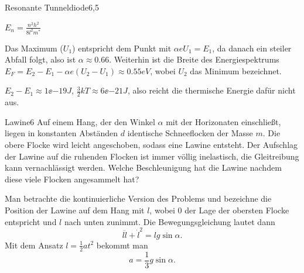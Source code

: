 \begin{problem}{Resonante Tunneldiode}{6,5}
\begin{solution}
\begin{abcenum}
\item $E_n = \frac{n^2 h^2}{8 l^2 m^*}$
\item Das Maximum ($U_1$) entspricht dem Punkt mit $\alpha e U_1 = E_1$, da danach ein steiler Abfall folgt, also ist $\alpha \approx 0.66$. Weiterhin ist die Breite des Energiespektrums $E_F = E_2 - E_1 - \alpha e (U_2 - U_1) \approx 0.55 \unit{eV}$, wobei $U_2$ das Minimum bezeichnet.
\item $E_2 - E_1 \approx 1\ee{-19}\unit{J}$, $\frac32 kT \approx 6\ee{-21}\unit{J}$, also reicht die thermische Energie dafür nicht aus.
\end{abcenum}
\end{solution}
\end{problem}


\begin{problem}{Lawine}{6}
Auf einem Hang, der den Winkel $\alpha$ mit der Horizonaten einschließt, liegen in konstanten Abständen $d$ identische Schneeflocken der Masse $m$. Die obere Flocke wird leicht angeschoben, sodass eine Lawine entsteht. Der Aufschlag der Lawine auf die ruhenden Flocken ist immer völlig inelastisch, die Gleitreibung kann vernachlässigt werden. Welche Beschleunigung hat die Lawine nachdem diese viele Flocken angesammelt hat?
\begin{solution}
Man betrachte die kontinuierliche Version des Problems und bezeichne die Position der Lawine auf dem Hang mit $l$, wobei $0$ der Lage der obersten Flocke entspricht und $l$ nach unten zunimmt. Die Bewegungsgleichung lautet dann
\[
l \ddot l + \dot l^2 = l g \sin\alpha.
\]
Mit dem Ansatz $l = \frac12 a t^2$ bekommt man
\[
a = \frac13 g \sin\alpha.
\]
\end{solution}
\end{problem}

